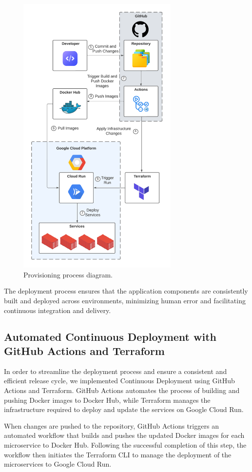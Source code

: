 \documentclass[a4paper,fleqn]{cas-dc}
\begin{document}
\begin{figure}[h]
\centering
\includegraphics[width=8cm]{Deployment.pdf}
\caption{Provisioning process diagram.}
\label{fig:deployment}
\end{figure}


The deployment process ensures that the application components are consistently built and deployed across environments, minimizing human error and facilitating continuous integration and delivery.

\subsection{Automated Continuous Deployment with GitHub Actions and Terraform}

In order to streamline the deployment process and ensure a consistent and efficient release cycle, we implemented Continuous Deployment using GitHub Actions and Terraform. GitHub Actions automates the process of building and pushing Docker images to Docker Hub, while Terraform manages the infrastructure required to deploy and update the services on Google Cloud Run.

When changes are pushed to the repository, GitHub Actions triggers an automated workflow that builds and pushes the updated Docker images for each microservice to Docker Hub. Following the successful completion of this step, the workflow then initiates the Terraform CLI to manage the deployment of the microservices to Google Cloud Run.
\end{document}

